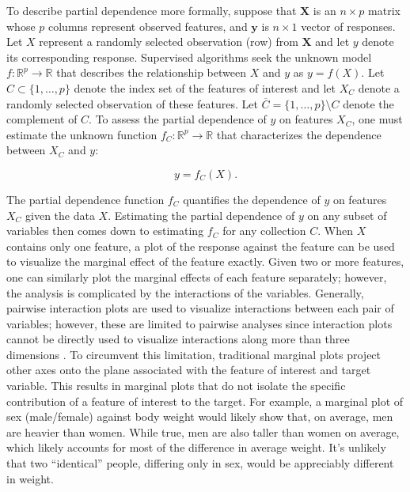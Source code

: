 \documentclass[12pt]{article}
\newcommand{\cut}[1]{}
\begin{document}
To describe partial dependence more formally, suppose that $\mathbf{X}$ is an $n \times p$ matrix whose $p$ columns represent observed features, and $\mathbf{y}$ is $n \times 1$ vector of responses. Let $X$ represent a randomly selected observation (row) from $\mathbf{X}$ and let $y$ denote its corresponding response. Supervised algorithms seek the unknown model $f:\mathbb{R}^{p} \rightarrow \mathbb{R}$ that describes the relationship between $X$ and $y$ as ${y} = f({X}).$ Let $C \subset \{1, \ldots, p\}$ denote the index set of the features of interest and let $X_C$ denote a randomly selected observation of these features. Let $\overline{C} = \{1, \ldots, p\} \setminus C$ denote the complement of $C$. To assess the partial dependence of $y$ on features $X_C$, one must estimate the unknown function $f_C: \mathbb{R}^{p} \rightarrow \mathbb{R}$ that characterizes the dependence between $X_C$ and $y$:

\begin{equation}\label{problem}
	y = f_C(X).
\end{equation}

The partial dependence function $f_C$ quantifies the dependence of $y$ on features ${X}_C$ given the data $X$. Estimating the partial dependence of $y$ on any subset of variables then comes down to estimating $f_C$ for any collection $C$. When $X$ contains only one feature, a plot of the response against the feature can be used to visualize the marginal effect of the feature exactly. Given two or more features, one can similarly plot the marginal effects of each feature separately; however, the analysis is complicated by the interactions of the variables. Generally, pairwise interaction plots are used to visualize interactions between each pair of variables; however, these are limited to pairwise analyses since interaction plots cannot be directly used to visualize interactions along more than three dimensions \citep{cox2014multivariate}. To circumvent this limitation, traditional marginal plots project other axes onto the plane associated with the feature of interest and target variable. \cut{{\color{red} reference for this? Is this like PCA? it implicitly projects. just plotting $x_c$ against $y$ does this automatically}}This results in marginal plots that do not isolate the specific contribution of a feature of interest to the target. For example, a marginal plot of sex (male/female) against body weight would likely show that, on average, men are heavier than women. While true, men are also taller than women on average, which likely accounts for most of the difference in average weight. It's unlikely that two ``identical'' people, differing only in sex, would be appreciably different in weight. 
\end{document}
